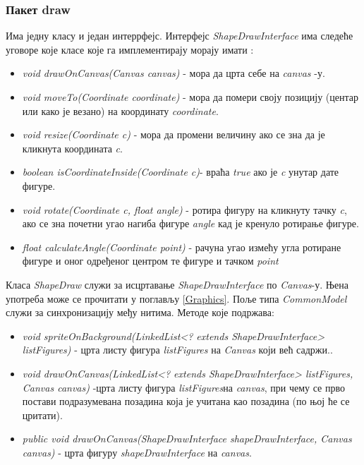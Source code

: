 \subsubsection{Пакет draw}
Има једну класу и један интеррфејс. 
Интерфејс \emph{ShapeDrawInterface} има следеће уговоре које класе које га имплементирају морају имати :
\begin{itemize}
\item \emph{void drawOnCanvas(Canvas canvas)} - мора да црта себе на \emph{canvas} -у.
\item \emph{void moveTo(Coordinate coordinate)} - мора да помери своју позицију (центар или како је везано) на координату \emph{coordinate}.
\item \emph{void resize(Coordinate c)} - мора да промени величину ако се зна да је кликнута координата \emph{c}.
\item \emph{boolean isCoordinateInside(Coordinate c)}- враћа \emph{true} ако је \emph{c} унутар дате фигуре.
\item \emph{void rotate(Coordinate c, float angle)}  - ротира фигуру на кликнуту тачку \emph{c}, ако се зна почетни угао нагиба фигуре  \emph{angle} кад је кренуло ротирање фигуре.  
\item \emph{float calculateAngle(Coordinate point)}  - рачуна угао измећу угла ротиране фигуре и оног одређеног центром те фигуре и тачком \emph{point}
\end{itemize}

Класа \emph{ShapeDraw} служи за исцртавање \emph{ShapeDrawInterface} по \emph{Canvas}-у. Њена употреба може се прочитати у поглављу \ref{Graphics}. Поље типа \emph{CommonModel} служи за синхронизацију међу нитима. Методе које подржава:
\begin{itemize}
\item \emph{void spriteOnBackground(LinkedList<? extends ShapeDrawInterface> listFigures)} - црта листу фигура \emph{listFigures} на \emph{Canvas} који већ садржи..
\item \emph{void drawOnCanvas(LinkedList<? extends ShapeDrawInterface> listFigures, Canvas canvas)} -црта листу фигура \emph{listFigures}на \emph{canvas}, при чему се прво постави подразумевана позадина која је учитана као позадина (по њој ће се цритати).
\item \emph{public void drawOnCanvas(ShapeDrawInterface shapeDrawInterface, Canvas canvas)} - црта фигуру \emph{shapeDrawInterface }на \emph{canvas}.
\end{itemize}

